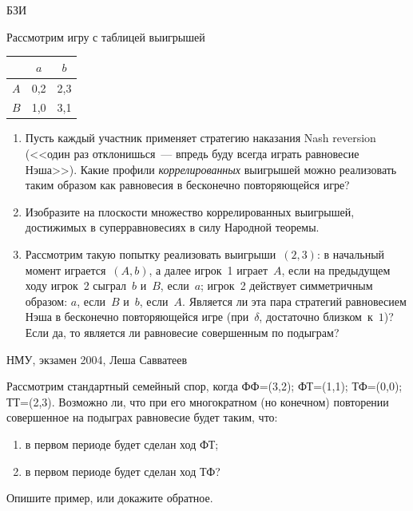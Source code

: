 \begin{problem}[Суперравновесия.]
\begin{source}
БЗИ
\end{source} Рассмотрим игру с таблицей
выигрышей \begin{center}
\begin{tabular}{|c|cc|}
\hline &$a$&$b$\\ \hline $A$&0,2&2,3\\ $B$&1,0&3,1\\ \hline
\end{tabular}
\end{center}

\begin{enumerate}

\item Пусть каждый участник применяет стратегию наказания
Nash reversion (<<один раз отклонишься~--- впредь буду
всегда играть равновесие Нэша>>). Какие профили {\em
коррелированных} выигрышей можно реализовать таким образом
как равновесия в бесконечно повторяющейся игре?

\item Изобразите на плоскости множество коррелированных
выигрышей, достижимых в суперравновесиях в силу Народной
теоремы.

\item Рассмотрим такую попытку реализовать
выигрыши~$(2,3)$: в начальный момент играется~$(A,b)$, а
далее игрок~1 играет~$A$, если на предыдущем ходу игрок~2
сыграл~$b$ и~$B$, если~$a$; игрок~2 действует симметричным
образом: $a$, если~$B$ и~$b$, если~$A$. Является ли эта
пара стратегий равновесием Нэша в бесконечно повторяющейся
игре (при~$\delta$, достаточно близком~к~$1$)? Если да, то
является ли равновесие совершенным по подыграм?

\end{enumerate}

\begin{sol}

\end{sol}
\end{problem}




\begin{problem}
\begin{source}
НМУ, экзамен 2004, Леша Савватеев
\end{source}
Рассмотрим стандартный семейный спор, когда ФФ=(3,2); ФТ=(1,1); ТФ=(0,0); ТТ=(2,3). Возможно ли, что при его многократном (но конечном) повторении совершенное на подыграх равновесие будет таким, что:
\begin{enumerate}
\item в первом периоде будет сделан ход ФТ;
\item в первом периоде будет сделан ход ТФ?
\end{enumerate}
Опишите пример, или докажите обратное.

\begin{sol}

\end{sol}
\end{problem}







